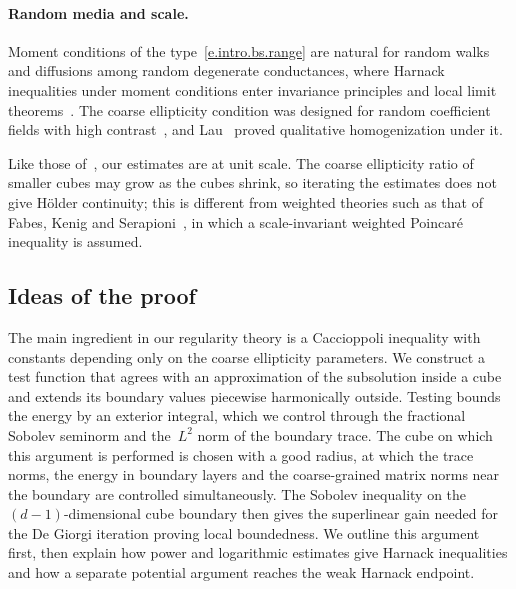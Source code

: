\documentclass[11pt,letterpaper]{article}
\numberwithin{equation}{section}
\theoremstyle{definition}
\begin{document}
\paragraph{Random media and scale.} Moment conditions of the type~\eqref{e.intro.bs.range} are natural for random walks and diffusions among random degenerate conductances, where Harnack inequalities under moment conditions enter invariance principles and local limit theorems~\cite{Biskup,Andres.Deuschel.Slowik.2015,Andres.Deuschel.Slowik.2016,Chiarini.Deuschel.2016,Chiarini.Deuschel.2015,Bella.Schaffner.RCM,Bella.Schaffner.parabolic}. The coarse ellipticity condition was designed for random coefficient fields with high contrast~\cite{AK.HC,AK.survey}, and Lau~\cite{Lau} proved qualitative homogenization under it.

Like those of~\cite{Trudinger,Bella.Schaffner.regularity,AADKM}, our estimates are at unit scale. The coarse ellipticity ratio of smaller cubes may grow as the cubes shrink, so iterating the estimates does not give H\"older continuity; this is different from weighted theories such as that of Fabes, Kenig and Serapioni~\cite{FKS}, in which a scale-invariant weighted Poincar\'e inequality is assumed.


\subsection{Ideas of the proof}
\label{ss.intro.ideas}


The main ingredient in our regularity theory is a Caccioppoli inequality with constants depending only on the coarse ellipticity parameters. We construct a test function that agrees with an approximation of the subsolution inside a cube and extends its boundary values piecewise harmonically outside. Testing bounds the energy by an exterior integral, which we control through the fractional Sobolev seminorm and the~$L^2$ norm of the boundary trace. The cube on which this argument is performed is chosen with a good radius, at which the trace norms, the energy in boundary layers and the coarse-grained matrix norms near the boundary are controlled simultaneously. The Sobolev inequality on the~$(d-1)$-dimensional cube boundary then gives the superlinear gain needed for the De Giorgi iteration proving local boundedness. We outline this argument first, then explain how power and logarithmic estimates give Harnack inequalities and how a separate potential argument reaches the weak Harnack endpoint.
\end{document}
